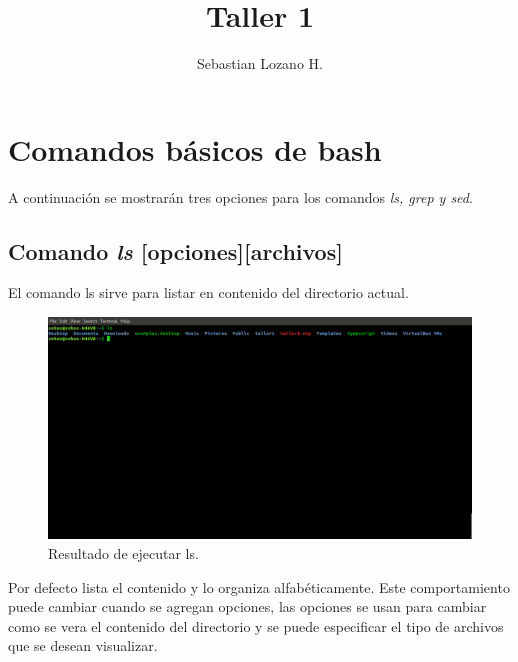 \documentclass{article}
\begin{document}
\title{Taller 1}
\author{Sebastian Lozano H.}

\maketitle

\section{Comandos básicos de bash}
A continuación se mostrarán tres opciones para los comandos \emph{ls, grep y sed}.

\subsection{Comando \emph{ls} [opciones][archivos]}
El comando ls sirve para listar en contenido del directorio actual.
\begin{figure}[h]
    \centering
    \includegraphics[width=\textwidth]{ls.png}
    \caption{Resultado de ejecutar ls.}
\end{figure}
Por defecto lista el contenido y lo organiza alfabéticamente. Este comportamiento puede cambiar cuando se agregan opciones, las opciones se usan para cambiar como se vera el contenido del directorio y se puede especificar el tipo de archivos que se desean visualizar.
\end{document}
